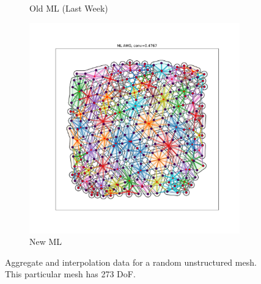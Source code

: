 \documentclass{article}
\begin{document}
\begin{figure}[h]
\begin{subfigure}[t]{0.32\textwidth}
    \caption{Old ML (Last Week)}
  \end{subfigure}
  \begin{subfigure}[t]{0.32\textwidth}
    \centering
    \includegraphics[width=\textwidth, trim=80 70 70 50, clip]{grid_800_new.pdf}
    \caption{New ML}
  \end{subfigure}
  \caption{Aggregate and interpolation data for a random unstructured mesh.  This particular mesh has 273 DoF.}
  \label{fig:grid800}
\end{figure}
\end{document}
